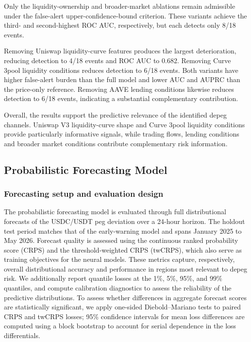 \documentclass[a4paper,fleqn]{cas-sc}
\begin{document}
Only the liquidity-ownership and broader-market ablations remain admissible under the false-alert upper-confidence-bound criterion. These variants achieve the third- and second-highest ROC AUC, respectively, but each detects only 8/18 events.

Removing Uniswap liquidity-curve features produces the largest deterioration, reducing detection to 4/18 events and ROC AUC to 0.682. Removing Curve 3pool liquidity conditions reduces detection to 6/18 events. Both variants have higher false-alert burden than the full model and lower AUC and AUPRC than the price-only reference. Removing AAVE lending conditions likewise reduces detection to 6/18 events, indicating a substantial complementary contribution.

Overall, the results support the predictive relevance of the identified depeg channels. Uniswap V3 liquidity-curve shape and Curve 3pool liquidity conditions provide particularly informative signals, while trading flows, lending conditions and broader market conditions contribute complementary risk information.

\subsection{Probabilistic Forecasting Model}
\subsubsection{Forecasting setup and evaluation design}

The probabilistic forecasting model is evaluated through full distributional forecasts of the USDC/USDT peg deviation over a 24-hour horizon. The holdout test period matches that of the early-warning model and spans January 2025 to May 2026. Forecast quality is assessed using the continuous ranked probability score (CRPS) and the threshold-weighted CRPS (twCRPS), which also serve as training objectives for the neural models. These metrics capture, respectively, overall distributional accuracy and performance in regions most relevant to depeg risk. We additionally report quantile losses at the 1\%, 5\%, 95\%, and 99\% quantiles, and compute calibration diagnostics to assess the reliability of the predictive distributions. To assess whether differences in aggregate forecast scores are statistically significant, we apply one-sided Diebold--Mariano tests to paired CRPS and twCRPS losses; 95\% confidence intervals for mean loss differences are computed using a block bootstrap to account for serial dependence in the loss differentials.
\end{document}
